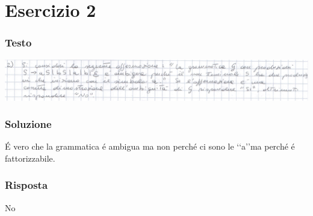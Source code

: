 \chapter{Esercizio 2}

\subsection{Testo}

\begin{center}
    \includegraphics[scale=0.2]{Chapters/Img/02text.png}\\
\end{center} 

\subsection{Soluzione}
\'E vero che la grammatica \'e ambigua ma non perch\'e ci sono le \lq\lq a\rq\rq ma perch\'e \'e fattorizzabile.

\subsection{Risposta}
No